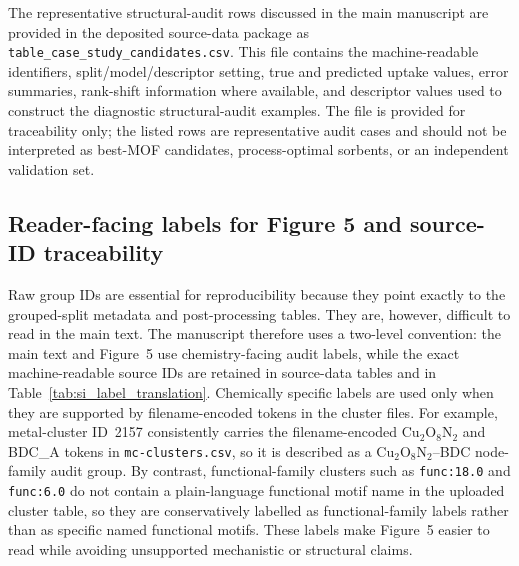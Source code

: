 \documentclass[11pt,a4paper]{article}
\begin{document}
The representative structural-audit rows discussed in the main manuscript are provided in the deposited source-data package as \texttt{table\_case\_study\_candidates.csv}. This file contains the machine-readable identifiers, split/model/descriptor setting, true and predicted uptake values, error summaries, rank-shift information where available, and descriptor values used to construct the diagnostic structural-audit examples. The file is provided for traceability only; the listed rows are representative audit cases and should not be interpreted as best-MOF candidates, process-optimal sorbents, or an independent validation set.



\subsection[Figure 5 labels and source-ID traceability]{Reader-facing labels for Figure 5 and source-ID traceability}
Raw group IDs are essential for reproducibility because they point exactly to the grouped-split metadata
and post-processing tables. They are, however, difficult to read in the main text. The manuscript therefore
uses a two-level convention: the main text and Figure~5 use chemistry-facing audit labels, while the exact
machine-readable source IDs are retained in source-data tables and in Table~\ref{tab:si_label_translation}.
Chemically specific labels are used only when they are supported by filename-encoded tokens in the
cluster files. For example, metal-cluster ID~2157 consistently carries the filename-encoded
Cu$_2$O$_8$N$_2$ and BDC\_A tokens in \texttt{mc-clusters.csv}, so it is described as a
Cu$_2$O$_8$N$_2$--BDC node-family audit group. By contrast, functional-family clusters such as
\texttt{func:18.0} and \texttt{func:6.0} do not contain a plain-language functional motif name in the
uploaded cluster table, so they are conservatively labelled as functional-family labels rather than as
specific named functional motifs. These labels make Figure~5 easier to read while avoiding unsupported
mechanistic or structural claims.
\end{document}
